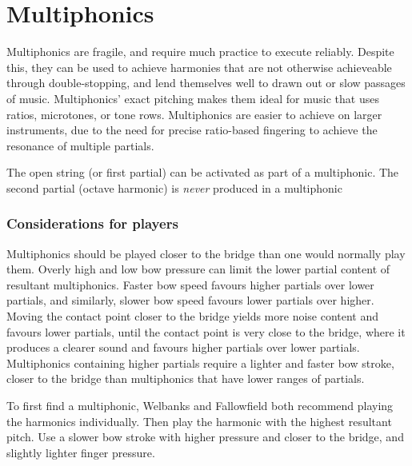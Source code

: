 \section{Multiphonics}\label{sec:multiphonics}

Multiphonics are fragile, and require much practice to execute reliably.
Despite this, they can be used to achieve harmonies that are not otherwise achieveable through double-stopping, and lend themselves well to drawn out or slow passages of music. 
Multiphonics' exact pitching makes them ideal for music that uses ratios, microtones, or tone rows. 
Multiphonics are easier to achieve on larger instruments, due to the need for precise ratio-based fingering to achieve the resonance of multiple partials.\autocite[http://www.cellomap.com/index/the-string/multiphonics-and-other-multiple-sounds/frequency-analysis.html]{fallowfieldCelloMap}

The open string (or first partial) can be activated as part of a multiphonic.\autocite[161]{welbanksFoundationsModernCello}
The second partial (octave harmonic) is \emph{never} produced in a multiphonic


\subsubsection{Considerations for players}
Multiphonics should be played closer to the bridge than one would normally play them.
Overly high and low bow pressure can limit the lower partial content of resultant multiphonics.
Faster bow speed favours higher partials over lower partials, and similarly, slower bow speed favours lower partials over higher.
Moving the contact point closer to the bridge yields more noise content and favours lower partials, until the contact point is very close to the bridge, where it produces a clearer sound and favours higher partials over lower partials.\autocite[http://www.cellomap.com/index/the-string/multiphonics-and-other-multiple-sounds.html]{fallowfieldCelloMap}
Multiphonics containing higher partials require a lighter and faster bow stroke, closer to the bridge than multiphonics that have lower ranges of partials.\autocite[165]{welbanksFoundationsModernCello}

To first find a multiphonic, Welbanks and Fallowfield both recommend playing the harmonics individually.\autocite[167]{welbanksFoundationsModernCello}
Then play the harmonic with the highest resultant pitch. 
Use a slower bow stroke with higher pressure and closer to the bridge, and slightly lighter finger pressure.


